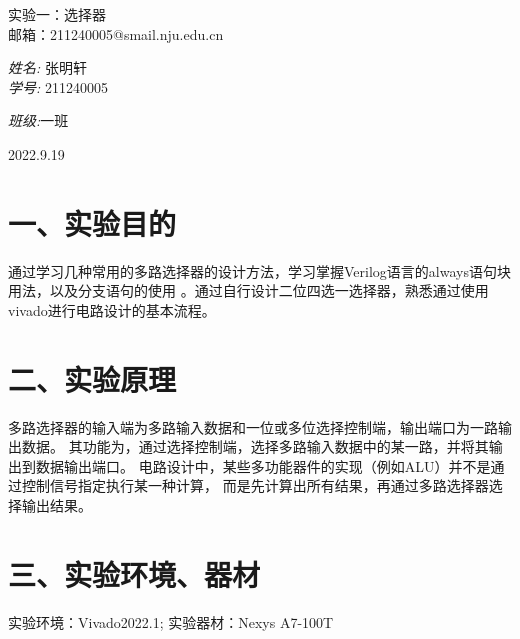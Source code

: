 \documentclass{report}
\begin{document}
\begin{titlepage}

  \begin{center}
  
  
  
  \textsc{\LARGE 实验一：选择器}\\[1.5cm]
  
  {邮箱：211240005@smail.nju.edu.cn}\\[1.5cm]
  
  
  
  
  \begin{minipage}{0.4\textwidth}
  \begin{flushleft} \large
  \emph{姓名:} 张明轩\\
  \emph{学号:} 211240005
  \end{flushleft}
  \end{minipage}
  \begin{minipage}{0.4\textwidth}
  \begin{flushright} \large
  \emph{班级:}一班 \\
  
  \end{flushright}
  \end{minipage}
  
  \vfill
  
  {\large 2022.9.19}
  
  \end{center}
  
  \end{titlepage}
\newpage
\section*{一、实验目的}
通过学习几种常用的多路选择器的设计方法，学习掌握Verilog语言的always语句块用法，以及分支语句的使用
。通过自行设计二位四选一选择器，熟悉通过使用vivado进行电路设计的基本流程。
\section*{二、实验原理}
多路选择器的输入端为多路输入数据和一位或多位选择控制端，输出端口为一路输出数据。
其功能为，通过选择控制端，选择多路输入数据中的某一路，并将其输出到数据输出端口。
电路设计中，某些多功能器件的实现（例如ALU）并不是通过控制信号指定执行某一种计算，
而是先计算出所有结果，再通过多路选择器选择输出结果。
\section*{三、实验环境、器材}
实验环境：Vivado2022.1;
实验器材：Nexys A7-100T
\end{document}
